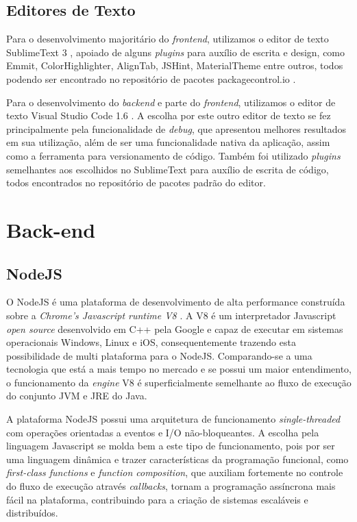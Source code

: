 \subsection{Editores de Texto}
Para o desenvolvimento majoritário do \textit{frontend}, utilizamos o editor de texto SublimeText 3 \cite{sublime}, apoiado de alguns \textit{plugins} para auxílio de escrita e design, como Emmit, ColorHighlighter, AlignTab, JSHint, MaterialTheme entre outros, todos podendo ser encontrado no repositório de pacotes packagecontrol.io \cite{packagecontrolio}.

Para o desenvolvimento do \textit{backend} e parte do \textit{frontend}, utilizamos o editor de texto Visual Studio Code 1.6 \cite{vscode}. A escolha por este outro editor de texto se fez principalmente pela funcionalidade de \textit{debug}, que apresentou melhores resultados em sua utilização, além de ser uma funcionalidade nativa da aplicação, assim como a ferramenta para versionamento de código. Também foi utilizado \textit{plugins} semelhantes aos escolhidos no SublimeText para auxílio de escrita de código, todos encontrados no repositório de pacotes padrão do editor.

\section{Back-end}
\subsection{NodeJS}
O NodeJS \cite{nodejs} é uma plataforma de desenvolvimento de alta performance construída sobre a \textit{Chrome's Javascript runtime V8} \cite{v8}. A V8 é um interpretador Javascript \textit{open source} desenvolvido em C++ pela Google e capaz de executar em sistemas operacionais Windows, Linux e iOS, consequentemente trazendo esta possibilidade de multi plataforma para o NodeJS. Comparando-se a uma tecnologia que está a mais tempo no mercado e se possui um maior entendimento, o funcionamento da \textit{engine} V8 é superficialmente semelhante ao fluxo de execução do conjunto JVM e JRE do Java.

A plataforma NodeJS possui uma arquitetura de funcionamento \textit{single-threaded} com operações orientadas a eventos e I/O não-bloqueantes. A escolha pela linguagem Javascript se molda bem a este tipo de funcionamento, pois por ser uma linguagem dinâmica e trazer características da programação funcional, como \textit{first-class functions} e \textit{function composition}, que auxiliam fortemente no controle do fluxo de execução através \textit{callbacks}, tornam a programação assíncrona mais fácil na plataforma, contribuindo para a criação de sistemas escaláveis e distribuídos.

